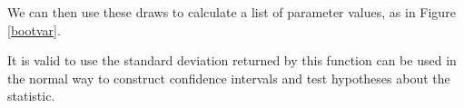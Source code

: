 
We can then use these draws to calculate a list of parameter values, as in Figure \ref{bootvar}.

It is valid to use the standard deviation returned by this function can
be used in the normal way to construct confidence intervals and test
hypotheses about the statistic.

